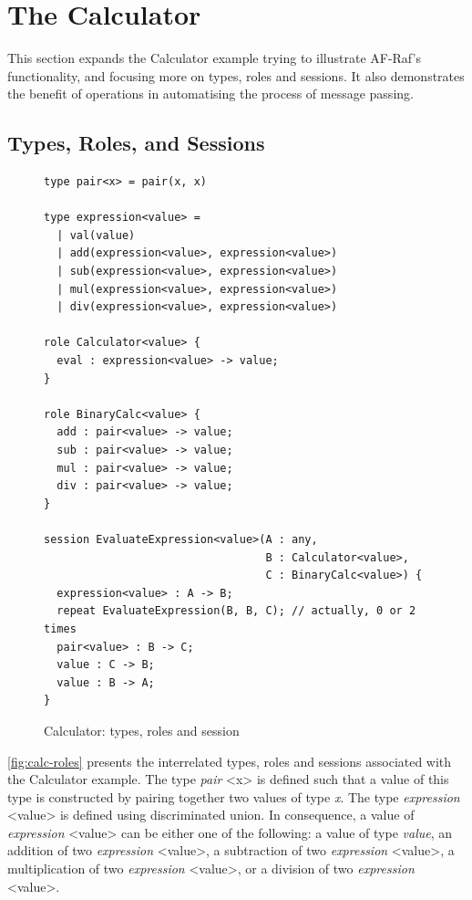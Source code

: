 \documentclass[a4paper,12pt,oneside,fleqn]{book} %
\begin{document}
{\section{The Calculator} %

This section expands the Calculator example trying to illustrate AF-Raf's
functionality, and focusing more on types, roles and sessions. It also
demonstrates the benefit of operations in automatising the process of
message passing.

\subsection{Types, Roles, and Sessions} %
\begin{figure}\footnotesize %
\begin{verbatim}
type pair<x> = pair(x, x)

type expression<value> =
  | val(value)
  | add(expression<value>, expression<value>)
  | sub(expression<value>, expression<value>)
  | mul(expression<value>, expression<value>)
  | div(expression<value>, expression<value>)

role Calculator<value> {
  eval : expression<value> -> value;
}

role BinaryCalc<value> {
  add : pair<value> -> value;
  sub : pair<value> -> value;
  mul : pair<value> -> value;
  div : pair<value> -> value;
}

session EvaluateExpression<value>(A : any,
                                  B : Calculator<value>,
                                  C : BinaryCalc<value>) {
  expression<value> : A -> B;
  repeat EvaluateExpression(B, B, C); // actually, 0 or 2 times
  pair<value> : B -> C;
  value : C -> B;
  value : B -> A;
}
\end{verbatim}
\caption{Calculator: types, roles and session}
\label{fig:calc-roles}
\end{figure} %

\autoref{fig:calc-roles} presents the interrelated types, roles and
sessions associated with the Calculator example. The type \textit{pair} <x>
is defined such that a value of this type is constructed by pairing
together two values of type \textit{x}. The type \textit{expression}
<value> is defined using discriminated union. In consequence, a value of
\textit{expression} <value> can be either one of the following: a value of
type \textit{value}, an addition of two \textit{expression} <value>, a
subtraction of two \textit{expression} <value>, a multiplication of two
\textit{expression} <value>, or a division of two \textit{expression}
<value>.

}
\end{document}
